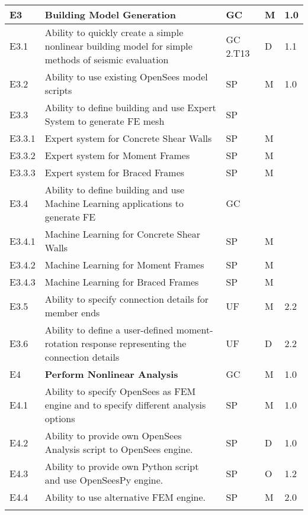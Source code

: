 \begin{longtable}{| p{} | p{} | p{} | p{} |  p{} |}
      
	E3 & \textbf{Building Model Generation} & GC & M & 1.0 \\ \hline
	E3.1 & Ability to quickly create a simple nonlinear building model for simple methods of seismic evaluation & GC 2.T13 & D & 1.1 \\ \hline
	E3.2 & Ability to use existing OpenSees model scripts & SP & M & 1.0 \\ \hline
	E3.3  & Ability to define building and use Expert System to generate FE mesh & SP & &  \\ \hline
	E3.3.1 & Expert system for Concrete Shear Walls & SP & M &  \\ \hline
	E3.3.2 & Expert system for Moment Frames & SP & M &  \\ \hline
	E3.3.3 & Expert system for  Braced Frames & SP & M &   \\ \hline
	E3.4 & Ability to define building and use Machine Learning applications to generate FE & GC &  &  \\ \hline
	E3.4.1 & Machine Learning for Concrete Shear Walls & SP & M &  \\ \hline
	E3.4.2 & Machine Learning for Moment Frames & SP & M &  \\ \hline
	E3.4.3 & Machine Learning for Braced Frames & SP & M &   \\ \hline
	E3.5 & Ability to specify connection details for member ends & UF & M & 2.2 \\ \hline
	E3.6 & Ability to define a user-defined moment-rotation response representing the connection details & UF & D & 2.2 \\  \hhline{=====}
	
	
	E4 & \textbf{Perform Nonlinear Analysis} & GC & M & 1.0 \\ \hline
	E4.1 & Ability to specify OpenSees as FEM engine and to specify different analysis options & SP & M & 1.0 \\ \hline
	E4.2 & Ability to provide own OpenSees Analysis script to OpenSees engine. & SP & D & 1.0 \\ \hline
	E4.3 & Ability to provide own Python script and use OpenSeesPy engine. & SP & O & 1.2 \\ \hline
	E4.4 & Ability to use alternative FEM engine. & SP & M & 2.0 \\ \hhline{=====}





\end{longtable}
